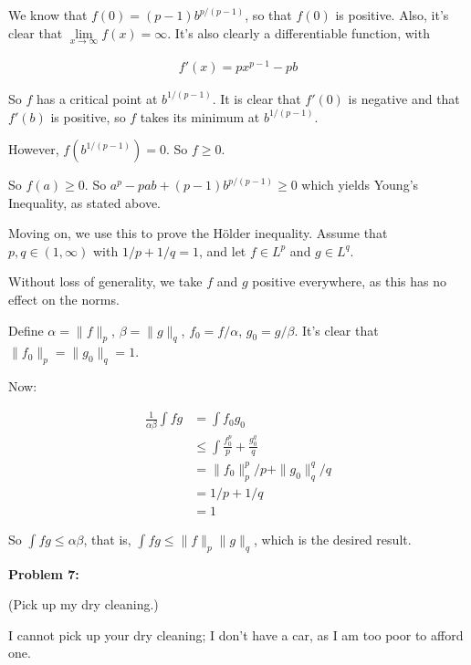 \documentclass[a4paper,12pt]{article}
\newcommand{\shunt}{\vspace{20mm}}
\newcommand{\norm}[1]{\|#1\|}
\newcommand{\al}{\alpha} %
\newcommand{\be}{\beta}
\begin{document}
We know that $f(0) = (p-1)b^{p/(p-1)}$, so that $f(0)$ is positive. Also, it's clear that $\lim\limits_{x \to \infty} f(x) = \infty$. It's also clearly a differentiable function, with

\begin{align*}
f'(x) = px^{p-1} - pb
\end{align*}

So $f$ has a critical point at $b^{1/(p-1)}$. It is clear that $f'(0)$ is negative and that $f'(b)$ is positive, so $f$ takes its minimum at $b^{1/(p-1)}$.

However, $f(b^{1/(p-1)})=0$. So $f \geq 0$.

So $f(a) \geq 0$. So $a^p-pab+(p-1)b^{p/(p-1)} \geq 0$ which yields Young's Inequality, as stated above.

Moving on, we use this to prove the H{\"o}lder inequality. Assume that $p,q \in (1, \infty)$ with $1/p + 1/q = 1$, and let $f \in L^p$ and $g \in L^q$. 

Without loss of generality, we take $f$ and $g$ positive everywhere, as this has no effect on the norms. 

Define $\al = \norm{f}_p$, $\be = \norm{g}_q$, $f_0 = f/\al$, $g_0 = g/\be$. It's clear that $\norm{f_0}_p = \norm{g_0}_q = 1$. 

Now:

\begin{align*}
\frac{1}{\al \be} \int fg &= \int f_0 g_0 \\
&\leq \int \frac{f_0^p}{p} + \frac{g_0^q}{q}\\
&= \norm{f_0}_p^p/p + \norm{g_0}_q^q/q\\
&= 1/p + 1/q\\
&=1
\end{align*}

So $\int fg \leq \al \be$, that is, $\int fg \leq \norm{f}_p\norm{g}_q$, which is the desired result.

\shunt

{\bf Problem 7:}

(Pick up my dry cleaning.)

I cannot pick up your dry cleaning; I don't have a car, as I am too poor to afford one.

\shunt
\end{document}
